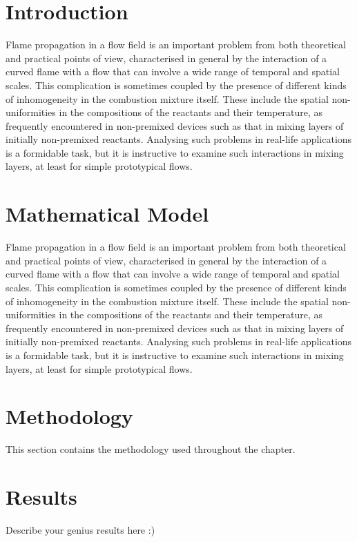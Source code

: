 \section{Introduction}
Flame propagation in a flow field is an important problem from both theoretical and practical points of view, characterised in general by the interaction of a curved flame with a flow that can involve a wide range of
temporal and spatial scales. This complication is sometimes coupled by the presence of different kinds of inhomogeneity in the combustion mixture itself. These include the spatial non-uniformities in the compositions of the reactants and their temperature, as frequently encountered in non-premixed devices such as that in mixing layers of initially non-premixed reactants. Analysing such problems in real-life applications is a formidable task, but it is instructive to examine such interactions in mixing layers, at least for simple prototypical flows.

\section{Mathematical Model}
Flame propagation in a flow field is an important problem from both theoretical and practical points of view, characterised in general by the interaction of a curved flame with a flow that can involve a wide range of
temporal and spatial scales. This complication is sometimes coupled by the presence of different kinds of inhomogeneity in the combustion mixture itself. These include the spatial non-uniformities in the compositions of the reactants and their temperature, as frequently encountered in non-premixed devices such as that in mixing layers of initially non-premixed reactants. Analysing such problems in real-life applications is a formidable task, but it is instructive to examine such interactions in mixing layers, at least for simple prototypical flows. 

\section{Methodology}

This section contains the methodology used throughout the chapter.

\section{Results}

Describe your  genius  results here :) 